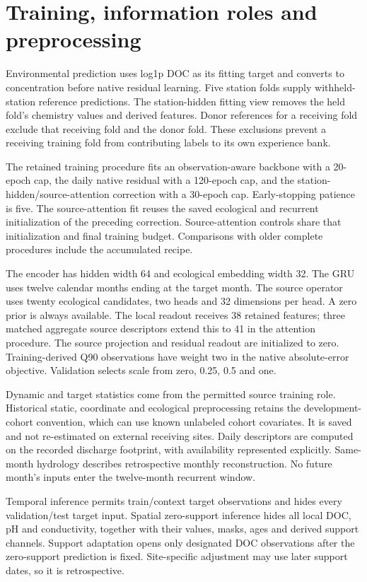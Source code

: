 \documentclass[10pt]{article}
\begin{document}
\section{Training, information roles and preprocessing}
Environmental prediction uses log1p DOC as its fitting target and converts to concentration before native residual learning. Five station folds supply withheld-station reference predictions. The station-hidden fitting view removes the held fold's chemistry values and derived features. Donor references for a receiving fold exclude that receiving fold and the donor fold. These exclusions prevent a receiving training fold from contributing labels to its own experience bank.

The retained training procedure fits an observation-aware backbone with a 20-epoch cap, the daily native residual with a 120-epoch cap, and the station-hidden/source-attention correction with a 30-epoch cap. Early-stopping patience is five. The source-attention fit reuses the saved ecological and recurrent initialization of the preceding correction. Source-attention controls share that initialization and final training budget. Comparisons with older complete procedures include the accumulated recipe.

The encoder has hidden width 64 and ecological embedding width 32. The GRU uses twelve calendar months ending at the target month. The source operator uses twenty ecological candidates, two heads and 32 dimensions per head. A zero prior is always available. The local readout receives 38 retained features; three matched aggregate source descriptors extend this to 41 in the attention procedure. The source projection and residual readout are initialized to zero. Training-derived Q90 observations have weight two in the native absolute-error objective. Validation selects scale from zero, 0.25, 0.5 and one.

Dynamic and target statistics come from the permitted source training role. Historical static, coordinate and ecological preprocessing retains the development-cohort convention, which can use known unlabeled cohort covariates. It is saved and not re-estimated on external receiving sites. Daily descriptors are computed on the recorded discharge footprint, with availability represented explicitly. Same-month hydrology describes retrospective monthly reconstruction. No future month's inputs enter the twelve-month recurrent window.

Temporal inference permits train/context target observations and hides every validation/test target input. Spatial zero-support inference hides all local DOC, pH and conductivity, together with their values, masks, ages and derived support channels. Support adaptation opens only designated DOC observations after the zero-support prediction is fixed. Site-specific adjustment may use later support dates, so it is retrospective.
\end{document}
